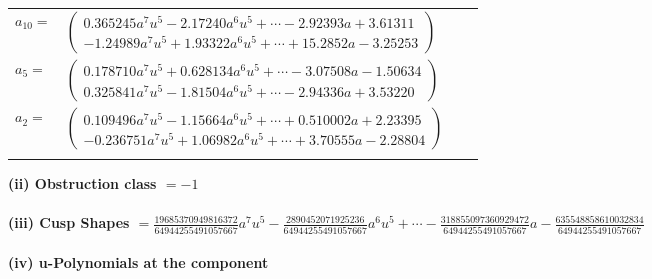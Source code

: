 \documentclass[1p]{elsarticle_modified}
\theoremstyle{definition}
\begin{document}
\begin{tabular}{m{7pt} m{180pt} m{7pt} m{180pt} }
\flushright $a_{10}=$&$\begin{pmatrix}0.365245 a^{7} u^{5}-2.17240 a^{6} u^{5}+\cdots-2.92393 a+3.61311\\-1.24989 a^{7} u^{5}+1.93322 a^{6} u^{5}+\cdots+15.2852 a-3.25253\end{pmatrix}$ \\
\flushright $a_{5}=$&$\begin{pmatrix}0.178710 a^{7} u^{5}+0.628134 a^{6} u^{5}+\cdots-3.07508 a-1.50634\\0.325841 a^{7} u^{5}-1.81504 a^{6} u^{5}+\cdots-2.94336 a+3.53220\end{pmatrix}$ \\
\flushright $a_{2}=$&$\begin{pmatrix}0.109496 a^{7} u^{5}-1.15664 a^{6} u^{5}+\cdots+0.510002 a+2.23395\\-0.236751 a^{7} u^{5}+1.06982 a^{6} u^{5}+\cdots+3.70555 a-2.28804\end{pmatrix}$\\&\end{tabular}
\flushleft \textbf{(ii) Obstruction class $= -1$}\\~\\
\flushleft \textbf{(iii) Cusp Shapes $= \frac{19685370949816372}{64944255491057667} a^7 u^5-\frac{2890452071925236}{64944255491057667} a^6 u^5+\cdots-\frac{318855097360929472}{64944255491057667} a-\frac{635548858610032834}{64944255491057667}$}\\~\\
\newpage\renewcommand{\arraystretch}{1}
\flushleft \textbf{(iv) u-Polynomials at the component}\newline \\
\end{document}
